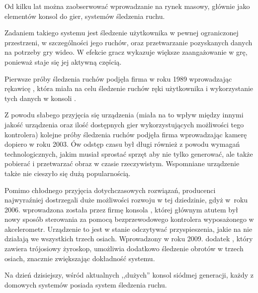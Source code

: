 \label{ch:current_state} %

Od kilku lat można zaobserwować wprowadzanie na rynek masowy, głównie jako elementów konsol do gier, systemów śledzenia ruchu.

Zadaniem takiego systemu jest śledzenie użytkownika w pewnej ograniczonej przestrzeni, w szczególności jego ruchów, oraz przetwarzanie pozyskanych danych na potrzeby gry wideo. W efekcie gracz wykazuje większe zaangażowanie w grę, ponieważ staje się jej aktywną częścią.

Pierwsze próby śledzenia ruchów podjęła firma  w roku 1989 wprowadzając rękawicę , która miała na celu śledzenie ruchów ręki użytkownika i wykorzystanie tych danych w konsoli .

Z powodu słabego przyjęcia się urządzenia (miała na to wpływ między innymi jakość urządzenia oraz ilość dostępnych gier wykorzystujących możliwości tego kontrolera) kolejne próby śledzenia ruchów podjęła firma  wprowadzając kamerę  dopiero w roku 2003. Ów odstęp czasu był długi również z powodu wymagań technologicznych, jakim musiał sprostać sprzęt aby nie tylko generować, ale także pobierać i przetwarzać obraz w czasie rzeczywistym. Wspomniane urządzenie także nie cieszyło się dużą popularnością.

Pomimo chłodnego przyjęcia dotychczasowych rozwiązań, producenci najwyraźniej dostrzegali duże możliwości rozwoju w tej dziedzinie, gdyż w~roku 2006. wprowadzona została przez firmę  konsola , której głównym atutem był nowy sposób sterowania \ppauza za pomocą bezprzewodowego kontrolera wyposażonego w akcelerometr. Urządzenie to jest w stanie odczytywać przyspieszenia, jakie na nie działają we wszystkich trzech osiach. Wprowadzony w roku 2009. dodatek , który zawiera trójosiowy żyroskop, umożliwia dodatkowo śledzenie obrotów w trzech osiach, znacznie zwiększając dokładność systemu.

Na dzień dzisiejszy, wśród aktualnych ,,dużych'' konsol siódmej generacji, każdy z domowych systemów posiada system śledzenia ruchu.

